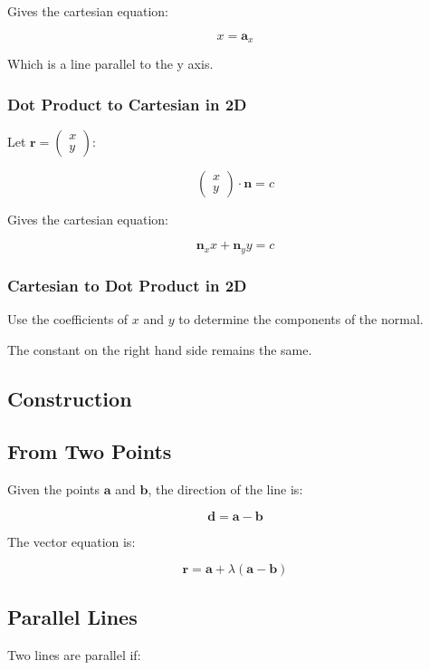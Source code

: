 \documentclass[a4paper,11pt]{article}
\newcommand{\bb}{\boldsymbol}
\begin{document}
Gives the cartesian equation:

$$
x = \bb{a}_x
$$

Which is a line parallel to the y axis.


\subsubsection{Dot Product to Cartesian in 2D}

Let $\bb{r} = \begin{pmatrix} x \\ y \end{pmatrix}$:

$$
\begin{pmatrix} x \\ y \end{pmatrix} \cdot \bb{n} = c
$$

Gives the cartesian equation:

$$
\bb{n}_x x + \bb{n}_y y = c
$$


\subsubsection{Cartesian to Dot Product in 2D}

Use the coefficients of $x$ and $y$ to determine the components of the normal.

The constant on the right hand side remains the same.


\subsection{Construction}

\subsection{From Two Points}

Given the points $\bb{a}$ and $\bb{b}$, the direction of the line is:

$$
\bb{d} = \bb{a} - \bb{b}
$$

The vector equation is:

$$
\bb{r} = \bb{a} + \lambda (\bb{a} - \bb{b})
$$


\subsection{Parallel Lines}

Two lines are parallel if:
\end{document}

